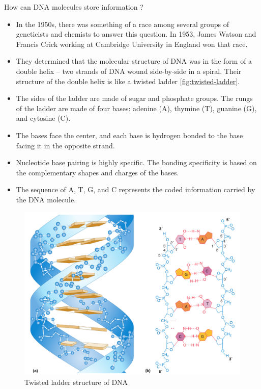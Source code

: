 \documentclass[11pt,dvipsnames,ignorenonframetext,aspectratio=169]{beamer}
\providecommand{\tightlist}{%
  \setlength{\itemsep}{0pt}\setlength{\parskip}{0pt}}
\begin{document}
\begin{frame}{How can DNA molecules store information ?}
\protect\hypertarget{how-can-dna-molecules-store-information}{}

\begin{itemize}
\tightlist
\item
  In the 1950s, there was something of a race among several groups of
  geneticists and chemists to answer this question. In 1953, James
  Watson and Francis Crick working at Cambridge University in England
  won that race.
\item
  They determined that the molecular structure of DNA was in the form of
  a double helix -- two strands of DNA wound side-by-side in a spiral.
  Their structure of the double helix is like a twisted ladder
  \ref{fig:twisted-ladder}.
\item
  The sides of the ladder are made of sugar and phosphate groups. The
  rungs of the ladder are made of four bases: adenine (A), thymine (T),
  guanine (G), and cytosine (C).
\end{itemize}

\end{frame}

\begin{frame}{}
\protect\hypertarget{section-10}{}

\begin{itemize}
\tightlist
\item
  The bases face the center, and each base is hydrogen bonded to the
  base facing it in the opposite strand.
\item
  Nucleotide base pairing is highly specific. The bonding specificity is
  based on the complementary shapes and charges of the bases.
\item
  The sequence of A, T, G, and C represents the coded information
  carried by the DNA molecule.
\end{itemize}

\begin{figure}

{\centering \includegraphics[width=0.38\linewidth]{../images/twisted_ladder_dna} 

}

\caption{Twisted ladder structure of DNA}\label{fig:dna-structure}
\end{figure}

\end{frame}
\end{document}
